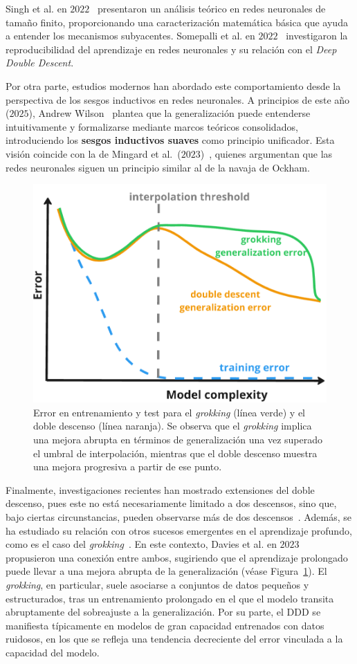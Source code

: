 Singh et al. en $2022$~\cite{Singh2022} presentaron un análisis teórico en redes neuronales de tamaño finito, proporcionando una caracterización matemática básica que ayuda a entender los mecanismos subyacentes. Somepalli et al. en $2022$~\cite{Somepalli2022} investigaron la reproducibilidad del aprendizaje en redes neuronales y su relación con el \textit{Deep Double Descent}.

Por otra parte, estudios modernos han abordado este comportamiento desde la perspectiva de los sesgos inductivos en redes neuronales. A principios de este año ($2025$), Andrew Wilson~\cite{Wilson2025} plantea que la generalización puede entenderse intuitivamente y formalizarse mediante marcos teóricos consolidados, introduciendo los \textbf{sesgos inductivos suaves} como principio unificador. Esta visión coincide con la de Mingard et al.\ ($2023$)~\cite{Mingard2023}, quienes argumentan que las redes neuronales siguen un principio similar al de la navaja de Ockham.

\begin{figure}[h]
    \centering
    \includegraphics[width=0.5\linewidth]{img/grokking.png}
    \caption[\textit{Grokking} y \textit{Deep Double Descent}.]{Error en entrenamiento y test para el \textit{grokking} (línea verde) y el doble descenso (línea naranja). Se observa que el \textit{grokking} implica una mejora abrupta en términos de generalización una vez superado el umbral de interpolación, mientras que el doble descenso muestra una mejora progresiva a partir de ese punto.}\label{fig:grokking}
\end{figure}

Finalmente, investigaciones recientes han mostrado extensiones del doble descenso, pues este no está necesariamente limitado a dos descensos, sino que, bajo ciertas circunstancias, pueden observarse más de dos descensos~\cite{d_Ascoli2021, Chen2021}. Además, se ha estudiado su relación con otros sucesos emergentes en el aprendizaje profundo, como es el caso del \emph{grokking}~\cite{Power2022}. En este contexto, Davies et al. en $2023$~\cite{Davies2023} propusieron una conexión entre ambos, sugiriendo que el aprendizaje prolongado puede llevar a una mejora abrupta de la generalización (véase Figura~\ref{fig:grokking}). El \textit{grokking}, en particular, suele asociarse a conjuntos de datos pequeños y estructurados, tras un entrenamiento prolongado en el que el modelo transita abruptamente del sobreajuste a la generalización. Por su parte, el DDD se manifiesta típicamente en modelos de gran capacidad entrenados con datos ruidosos, en los que se refleja una tendencia decreciente del error vinculada a la capacidad del modelo.

